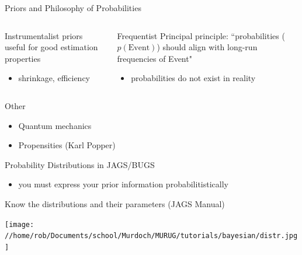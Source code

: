 \documentclass[presentation,9pt,xcolor=dvipsnames]{beamer}
\begin{document}
\begin{frame}[label={sec:org94a35f2}]{Priors and Philosophy of Probabilities}
\begin{columns}
\begin{column}{0.4\columnwidth}
\begin{block}{Instrumentalist}
priors useful for good estimation properties
\begin{itemize}
\item shrinkage, efficiency
\end{itemize}
\end{block}
\end{column}
\begin{column}{0.6\columnwidth}
\begin{block}{Frequentist}
Principal principle: ``probabilities (\(p(\text{Event})\)) should align with long-run frequencies of Event"
\begin{itemize}
\item probabilities do not exist in reality
\end{itemize}
\end{block}
\end{column}
\end{columns}
\begin{block}{Other}
\begin{itemize}
\item Quantum mechanics
\item Propensities (Karl Popper)
\end{itemize}
\end{block}
\end{frame}
\begin{frame}[label={sec:org1cd6ac6}]{Probability Distributions in JAGS/BUGS}
\begin{itemize}
\item you must express your prior information \alert{probabilitistically}
\end{itemize}
\begin{block}{Know the distributions and their parameters (JAGS Manual)}
\begin{center}
\texttt{[image: //home/rob/Documents/school/Murdoch/MURUG/tutorials/bayesian/distr.jpg]}
\end{center}
\end{block}
\end{frame}
\end{document}
